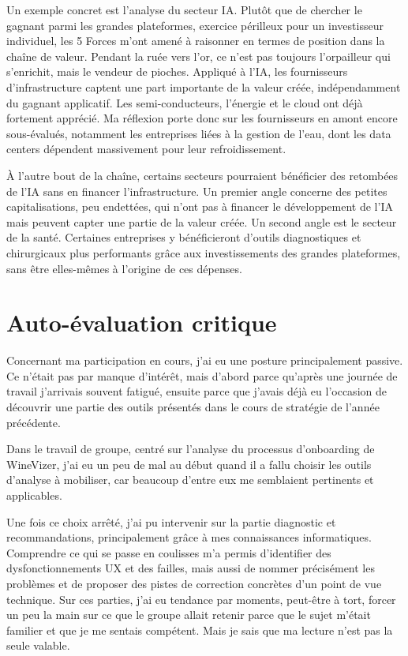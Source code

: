 \documentclass[12pt, a4paper]{article}
\begin{document}
Un exemple concret est l'analyse du secteur IA. Plutôt que 
de chercher le gagnant parmi les grandes plateformes, exercice 
périlleux pour un investisseur individuel, les 5 Forces m'ont 
amené à raisonner en termes de position dans la chaîne de 
valeur. Pendant la ruée vers l'or, ce n'est pas toujours 
l'orpailleur qui s'enrichit, mais le vendeur de pioches. 
Appliqué à l'IA, les fournisseurs d'infrastructure captent 
une part importante de la valeur créée, indépendamment du 
gagnant applicatif. Les semi-conducteurs, l'énergie et le cloud 
ont déjà fortement apprécié. Ma réflexion porte donc sur les 
fournisseurs en amont encore sous-évalués, notamment les 
entreprises liées à la gestion de l'eau, dont les data centers 
dépendent massivement pour leur refroidissement.

À l'autre bout de la chaîne, certains secteurs pourraient bénéficier 
des retombées de l'IA sans en financer l'infrastructure. 
Un premier angle concerne des petites capitalisations, 
peu endettées, qui n'ont pas à financer le développement de l'IA 
mais peuvent capter une partie de la valeur créée. 
Un second angle est le secteur de la santé. Certaines 
entreprises y bénéficieront d'outils diagnostiques et 
chirurgicaux plus performants grâce aux investissements 
des grandes plateformes, sans être elles-mêmes à l'origine 
de ces dépenses.

\section{Auto-évaluation critique}

Concernant ma participation en cours, j'ai eu une posture 
principalement passive. Ce n'était pas par manque d'intérêt, 
mais d'abord parce qu'après une journée de travail j'arrivais 
souvent fatigué, ensuite parce que j'avais déjà eu l'occasion 
de découvrir une partie des outils présentés dans le cours de 
stratégie de l'année précédente.

Dans le travail de groupe, centré sur l'analyse du processus 
d'onboarding de WineVizer, j'ai eu un peu de mal au début 
quand il a fallu choisir les outils d'analyse à mobiliser, 
car beaucoup d'entre eux me semblaient pertinents et applicables. 

Une fois ce choix arrêté, j'ai pu intervenir sur la partie 
diagnostic et recommandations, principalement grâce à mes 
connaissances informatiques. Comprendre ce qui se passe en 
coulisses m'a permis d'identifier des dysfonctionnements UX 
et des failles, mais aussi de nommer précisément 
les problèmes et de proposer des pistes de correction 
concrètes d'un point de vue technique. Sur ces parties, j'ai eu tendance par moments,
peut-être à tort, forcer
un peu la main sur ce que le groupe allait retenir parce que 
le sujet m'était familier et que je me sentais compétent. 
Mais je sais que ma lecture n'est pas la seule valable.
\end{document}
